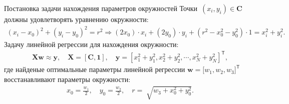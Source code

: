 \documentclass[9pt,pdf,hyperref={unicode}]{beamer}
\begin{document}
\begin{frame}[shrink=5]{Постановка задачи нахождения параметров окружностей}
Точки~$\left(x_i, y_i\right)\in\textbf{C}$ должны удовлетворять уравнению окружности:
\begin{equation*}
\begin{aligned}
\left(x_i - x_0\right)^{2}+\left(y_i-y_0\right)^2 = r^2 \Rightarrow (2x_0)\cdot x_i + (2y_0)\cdot y_i+(r^2-x_0^2-y_0^2)\cdot1 = x_{i}^2 + y_{i}^2.
\end{aligned}
\end{equation*}
Задачу линейной регрессии для нахождения окружности:
\begin{equation*}
\begin{aligned}
\textbf{X}\textbf{w} \approx \textbf{y},  \quad \textbf{X} = \left[\textbf{C}, \textbf{1}\right], \quad \textbf{y} = [x_1^2+y_1^2, x_2^2+y_2^2, \cdots, x_N^2+y_N^2]^{\mathsf{T}},
\end{aligned}
\end{equation*}
где найденые оптимальные параметры линейной регрессии $\textbf{w} = \bigr[w_1, w_2, w_3\bigr]^{\mathsf{T}}$ восстанавливают параметры окружности:
\begin{equation*}
\begin{aligned}
x_0 = \frac{w_1}{2}, \quad y_0 = \frac{w_2}{2}, \quad r = \sqrt[]{w_3+x_{0}^{2}+y_{0}^{2}}.
\end{aligned}
\end{equation*}

\end{frame}
\end{document}
